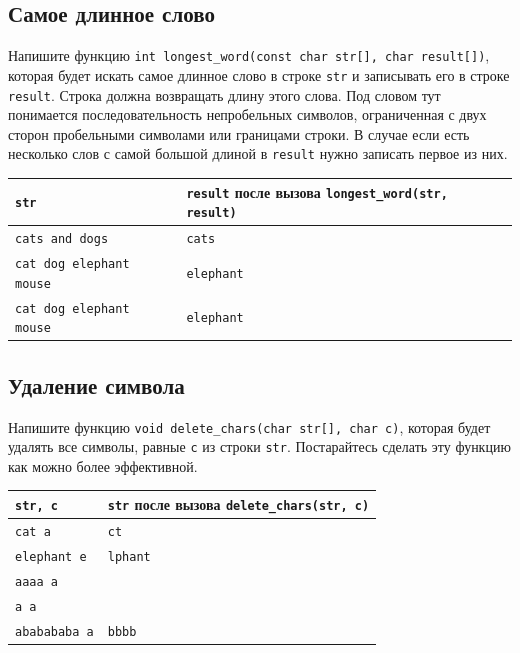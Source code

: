 \documentclass{article}
\begin{document}
\subsection{Самое длинное слово}
Напишите функцию \texttt{int longest\_word(const char str[], char result[])}, которая будет искать самое длинное слово в строке \texttt{str} и записывать его в строке \texttt{result}. Строка должна возвращать длину этого слова. Под словом тут понимается последовательность непробельных символов, ограниченная с двух сторон пробельными символами или границами строки.
В случае если есть несколько слов с самой большой длиной в \texttt{result} нужно записать первое из них.

\begin{center}
\begin{tabular}{ l | l }
 \texttt{str} & \texttt{result} после вызова \texttt{longest\_word(str, result)} \\ \hline
 \texttt{cats and dogs} & \texttt{cats} \\
 \texttt{cat dog elephant mouse} & \texttt{elephant} \\
 \texttt{cat \quad dog \quad\quad elephant mouse} & \texttt{elephant} \\
\end{tabular}
\end{center}

\subsection{Удаление символа}
Напишите функцию \texttt{void delete\_chars(char str[], char c)}, которая будет удалять все символы, равные \texttt{c} из строки \texttt{str}. Постарайтесь сделать эту функцию как можно более эффективной.

\begin{center}
\begin{tabular}{ l | l }
 \texttt{str, c} & \texttt{str} после вызова \texttt{delete\_chars(str, c)} \\ \hline
 \texttt{cat a} & \texttt{ct} \\
 \texttt{elephant e} & \texttt{lphant} \\
 \texttt{aaaa a} & \texttt{} \\
 \texttt{a a} & \texttt{} \\
 \texttt{ababababa a} & \texttt{bbbb} \\
\end{tabular}
\end{center}
\end{document}
